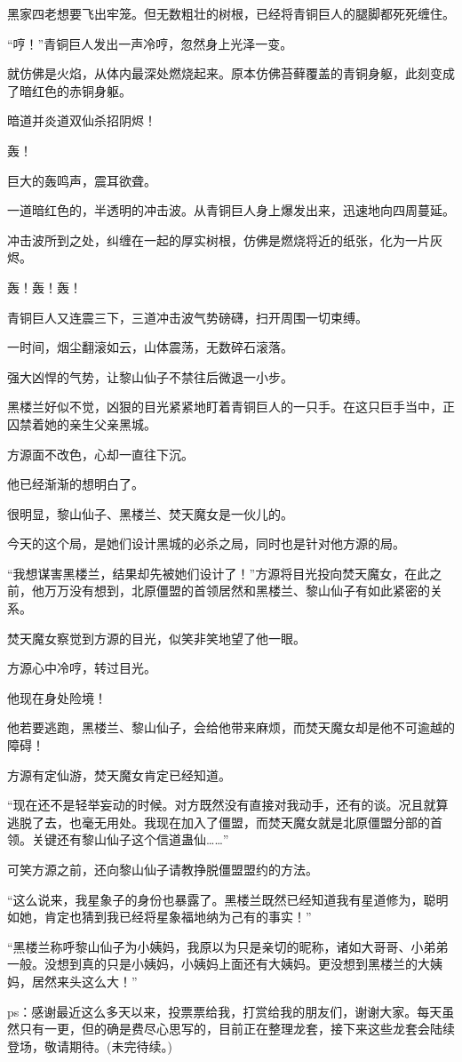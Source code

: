 \begin{this_body}
黑家四老想要飞出牢笼。但无数粗壮的树根，已经将青铜巨人的腿脚都死死缠住。

“哼！”青铜巨人发出一声冷哼，忽然身上光泽一变。

就仿佛是火焰，从体内最深处燃烧起来。原本仿佛苔藓覆盖的青铜身躯，此刻变成了暗红色的赤铜身躯。

暗道并炎道双仙杀招阴烬！

轰！

巨大的轰鸣声，震耳欲聋。

一道暗红色的，半透明的冲击波。从青铜巨人身上爆发出来，迅速地向四周蔓延。

冲击波所到之处，纠缠在一起的厚实树根，仿佛是燃烧将近的纸张，化为一片灰烬。

轰！轰！轰！

青铜巨人又连震三下，三道冲击波气势磅礴，扫开周围一切束缚。

一时间，烟尘翻滚如云，山体震荡，无数碎石滚落。

强大凶悍的气势，让黎山仙子不禁往后微退一小步。

黑楼兰好似不觉，凶狠的目光紧紧地盯着青铜巨人的一只手。在这只巨手当中，正囚禁着她的亲生父亲黑城。

方源面不改色，心却一直往下沉。

他已经渐渐的想明白了。

很明显，黎山仙子、黑楼兰、焚天魔女是一伙儿的。

今天的这个局，是她们设计黑城的必杀之局，同时也是针对他方源的局。

“我想谋害黑楼兰，结果却先被她们设计了！”方源将目光投向焚天魔女，在此之前，他万万没有想到，北原僵盟的首领居然和黑楼兰、黎山仙子有如此紧密的关系。

焚天魔女察觉到方源的目光，似笑非笑地望了他一眼。

方源心中冷哼，转过目光。

他现在身处险境！

他若要逃跑，黑楼兰、黎山仙子，会给他带来麻烦，而焚天魔女却是他不可逾越的障碍！

方源有定仙游，焚天魔女肯定已经知道。

“现在还不是轻举妄动的时候。对方既然没有直接对我动手，还有的谈。况且就算逃脱了去，也毫无用处。我现在加入了僵盟，而焚天魔女就是北原僵盟分部的首领。关键还有黎山仙子这个信道蛊仙……”

可笑方源之前，还向黎山仙子请教挣脱僵盟盟约的方法。

“这么说来，我星象子的身份也暴露了。黑楼兰既然已经知道我有星道修为，聪明如她，肯定也猜到我已经将星象福地纳为己有的事实！”

“黑楼兰称呼黎山仙子为小姨妈，我原以为只是亲切的昵称，诸如大哥哥、小弟弟一般。没想到真的只是小姨妈，小姨妈上面还有大姨妈。更没想到黑楼兰的大姨妈，居然来头这么大！”

ps：感谢最近这么多天以来，投票票给我，打赏给我的朋友们，谢谢大家。每天虽然只有一更，但的确是费尽心思写的，目前正在整理龙套，接下来这些龙套会陆续登场，敬请期待。(未完待续。)

\end{this_body}

